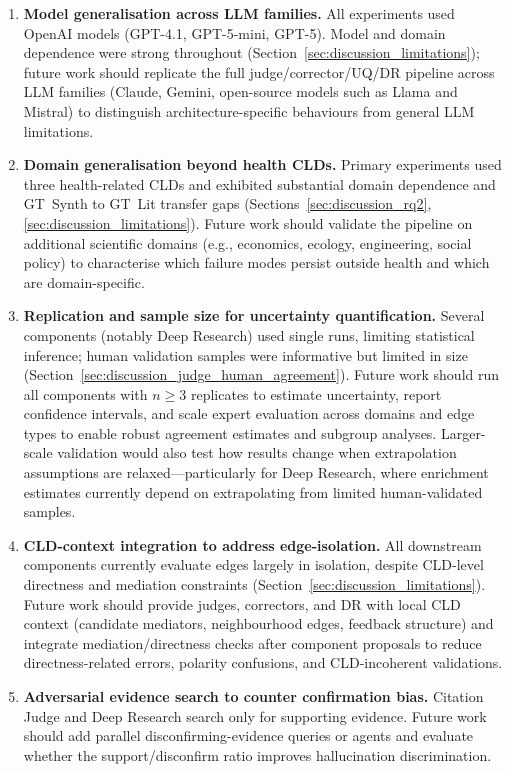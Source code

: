 \begin{enumerate}[noitemsep]
    \item \textbf{Model generalisation across LLM families.} All experiments used OpenAI models (GPT-4.1, GPT-5-mini, GPT-5). Model and domain dependence were strong throughout (Section~\ref{sec:discussion_limitations}); future work should replicate the full judge/corrector/UQ/DR pipeline across LLM families (Claude, Gemini, open-source models such as Llama and Mistral) to distinguish architecture-specific behaviours from general LLM limitations.
    \item \textbf{Domain generalisation beyond health CLDs.} Primary experiments used three health-related CLDs and exhibited substantial domain dependence and GT~Synth to GT~Lit transfer gaps (Sections~\ref{sec:discussion_rq2}, \ref{sec:discussion_limitations}). Future work should validate the pipeline on additional scientific domains (e.g., economics, ecology, engineering, social policy) to characterise which failure modes persist outside health and which are domain-specific.
    \item \textbf{Replication and sample size for uncertainty quantification.} Several components (notably Deep Research) used single runs, limiting statistical inference; human validation samples were informative but limited in size (Section~\ref{sec:discussion_judge_human_agreement}). Future work should run all components with $n \geq 3$ replicates to estimate uncertainty, report confidence intervals, and scale expert evaluation across domains and edge types to enable robust agreement estimates and subgroup analyses. Larger-scale validation would also test how results change when extrapolation assumptions are relaxed---particularly for Deep Research, where enrichment estimates currently depend on extrapolating from limited human-validated samples.
    \item \textbf{CLD-context integration to address edge-isolation.} All downstream components currently evaluate edges largely in isolation, despite CLD-level directness and mediation constraints (Section~\ref{sec:discussion_limitations}). Future work should provide judges, correctors, and DR with local CLD context (candidate mediators, neighbourhood edges, feedback structure) and integrate mediation/directness checks after component proposals to reduce directness-related errors, polarity confusions, and CLD-incoherent validations.
    \item \textbf{Adversarial evidence search to counter confirmation bias.} Citation Judge and Deep Research search only for supporting evidence. Future work should add parallel disconfirming-evidence queries or agents and evaluate whether the support/disconfirm ratio improves hallucination discrimination.
\end{enumerate}

